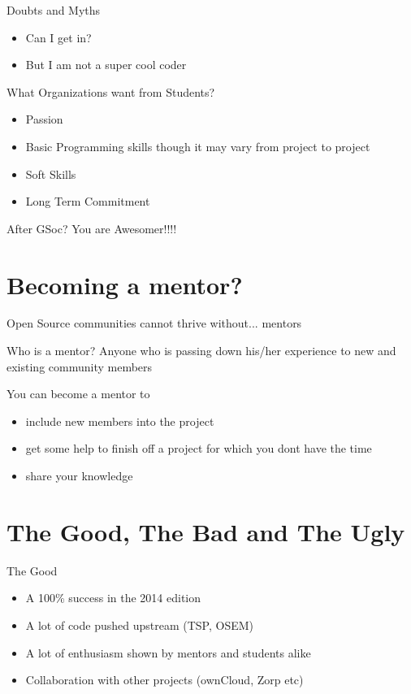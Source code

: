 \documentclass{beamer}
\begin{document}
\begin{frame}{Doubts and Myths}
\begin{itemize}
\pause
\item Can I get in? \pause
\item But I am not a super cool coder 
\end{itemize}
\end{frame}

\begin{frame}{What Organizations want from Students?}
\begin{itemize}
\pause
\item Passion \pause
\item Basic Programming skills though it may vary from project to project \pause
\item Soft Skills \pause
\item Long Term Commitment
\end{itemize}
\end{frame}

\begin{frame}{After GSoc?}
\pause
You are Awesomer!!!!
\end{frame}

\section{Becoming a mentor?}
\begin{frame}{Open Source communities cannot thrive without...}
\pause
mentors
\end{frame}

\begin{frame}{Who is a mentor?}
\pause
Anyone who is passing down his/her experience to new and existing community members
\end{frame}


\begin{frame}{You can become a mentor to}
\pause
\begin{itemize}
\item include new members into the project \pause
\item get some help to finish off a project for which you dont have the time \pause
\item share your knowledge \pause
\end{itemize}
\end{frame} 

\section{The Good, The Bad and The Ugly}
\begin{frame}{The Good}
\pause
\begin{itemize}
\item A 100\% success in the 2014 edition \pause
\item A lot of code pushed upstream (TSP, OSEM) \pause
\item A lot of enthusiasm shown by mentors and students alike \pause
\item Collaboration with other projects (ownCloud, Zorp etc) \pause
\end{itemize}
\end{frame}
\end{document}
